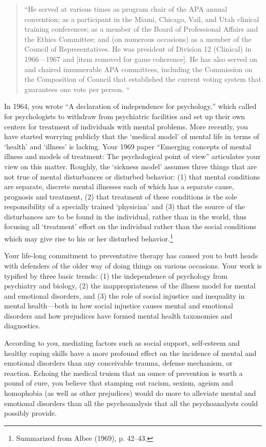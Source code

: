 \begin{quote}

“He served at various times as program chair of the APA annual convention; as a participant in the Miami, Chicago, Vail, and Utah clinical training conferences; as a member of the Board of Professional Affairs and the Ethics Committee; and (on numerous occasions) as a member of the Council of Representatives. He was president of Division 12 (Clinical) in 1966—1967 and [item removed for game coherence]. He has also served on and chaired innumerable APA committees, including the Commission on the Composition of Council that established the current voting system that guarantees one vote per person. “
\end{quote}

In 1964, you wrote “A declaration of independence for psychology,” which called for psychologists to withdraw from psychiatric facilities and set up their own centers for treatment of individuals with mental problems. More recently, you have started worrying publicly that the ‘medical model’ of mental life in terms of ‘health’ and ‘illness’ is lacking. Your 1969 paper “Emerging concepts of mental illness and models of treatment: The psychological point of view” articulates your view on this matter. Roughly, the ‘sickness model’ assumes three things that are not true of mental disturbances or disturbed behavior: (1) that mental conditions are separate, discrete mental illnesses each of which has a separate cause, prognosis and treatment, (2) that treatment of these conditions is the sole responsibility of a specially trained ‘physician’ and (3) that the source of the disturbances are to be found in the individual, rather than in the world, thus focusing all ‘treatment’ effort on the individual rather than the social conditions which may give rise to his or her disturbed behavior.\footnote{Summarized from Albee (1969), p. 42--43.}

Your life-long commitment to preventative therapy has caused you to butt heads with defenders of the older way of doing things on various occasions. Your work is typified by three basic trends: (1) the independence of psychology from psychiatry and biology, (2) the inappropriateness of the illness model for mental and emotional disorders, and (3) the role of social injustice and inequality in mental health—both in how social injustice causes mental and emotional disorders and how prejudices have formed mental health taxonomies and diagnostics.

According to you, mediating factors such as social support, self-esteem and healthy coping skills have a more profound effect on the incidence of mental and emotional disorders than any conceivable trauma, defense mechanism, or reaction. Echoing the medical truism that an ounce of prevention is worth a pound of cure, you believe that stamping out racism, sexism, ageism and homophobia (as well as other prejudices) would do more to alleviate mental and emotional disorders than all the psychoanalysis that all the psychoanalysts could possibly provide.

